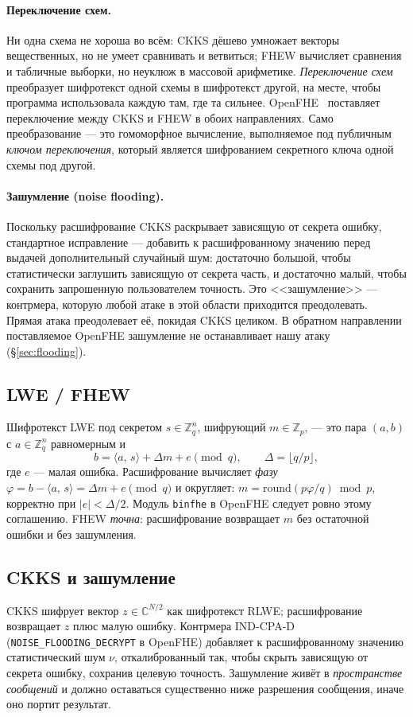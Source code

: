 \documentclass[11pt]{article}
\newcommand{\inner}[2]{\langle #1,\, #2\rangle}
\newcommand{\Z}{\mathbb{Z}}
\newcommand{\code}[1]{\texttt{#1}}
\begin{document}
\paragraph{Переключение схем.}
Ни одна схема не хороша во всём: CKKS дёшево умножает векторы вещественных, но не умеет сравнивать и
ветвиться; FHEW вычисляет сравнения и табличные выборки, но неуклюж в массовой арифметике.
\emph{Переключение схем} преобразует шифротекст одной схемы в шифротекст другой, на месте, чтобы
программа использовала каждую там, где та сильнее. OpenFHE~\cite{openfhe} поставляет переключение
между CKKS и FHEW в обоих направлениях. Само преобразование --- это гомоморфное вычисление,
выполняемое под публичным \emph{ключом переключения}, который является шифрованием секретного ключа
одной схемы под другой.

\paragraph{Зашумление (noise flooding).}
Поскольку расшифрование CKKS раскрывает зависящую от секрета ошибку, стандартное исправление ---
добавить к расшифрованному значению перед выдачей дополнительный случайный шум: достаточно большой,
чтобы статистически заглушить зависящую от секрета часть, и достаточно малый, чтобы сохранить
запрошенную пользователем точность. Это <<зашумление>> --- контрмера, которую любой атаке в этой
области приходится преодолевать. Прямая атака \citeauthor{santato2026} преодолевает её, покидая CKKS
целиком. В обратном направлении поставляемое OpenFHE зашумление не останавливает нашу атаку
(\S\ref{sec:flooding}).

\subsection{LWE / FHEW}
Шифротекст LWE под секретом $s \in \Z_q^n$, шифрующий $m \in \Z_p$, --- это пара $(a, b)$ с
$a \in \Z_q^n$ равномерным и
\[
  b = \inner{a}{s} + \Delta m + e \pmod q, \qquad \Delta = \lfloor q/p \rfloor,
\]
где $e$ --- малая ошибка. Расшифрование вычисляет \emph{фазу}
$\varphi = b - \inner{a}{s} = \Delta m + e \pmod q$ и округляет:
$m = \mathrm{round}(p\varphi/q) \bmod p$, корректно при $|e| < \Delta/2$. Модуль \code{binfhe} в
OpenFHE следует ровно этому соглашению. FHEW \emph{точна}: расшифрование возвращает $m$ без
остаточной ошибки и без зашумления.

\subsection{CKKS и зашумление}
CKKS шифрует вектор $z \in \mathbb{C}^{N/2}$ как шифротекст RLWE; расшифрование возвращает $z$ плюс
малую ошибку. Контрмера IND-CPA-D (\code{NOISE\_FLOODING\_DECRYPT} в OpenFHE) добавляет к
расшифрованному значению статистический шум $\nu$, откалиброванный так, чтобы скрыть зависящую от
секрета ошибку, сохранив целевую точность. Зашумление живёт в \emph{пространстве
сообщений} и должно оставаться существенно ниже разрешения сообщения, иначе оно портит результат.
\end{document}
